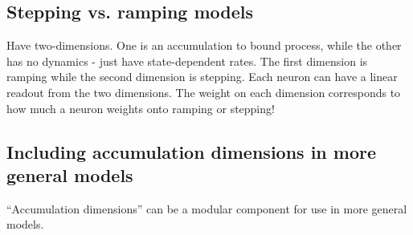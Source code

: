 \documentclass{article}
\begin{document}
\subsection{Stepping vs. ramping models}
Have two-dimensions. One is an accumulation to bound process, while the other has no dynamics - just have state-dependent rates. The first dimension is ramping while the second dimension is stepping. Each neuron can have a linear readout from the two dimensions. The weight on each dimension corresponds to how much a neuron weights onto ramping or stepping! 

\subsection{Including accumulation dimensions in more general models}
``Accumulation dimensions'' can be a modular component for use in more general models. 
\end{document}
